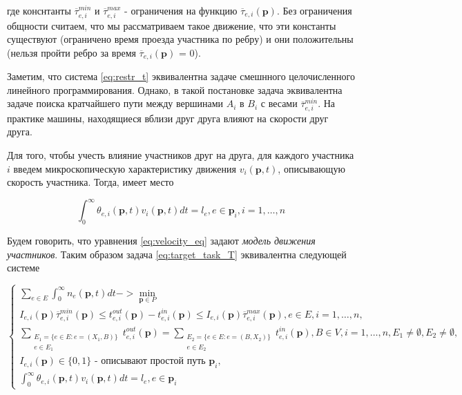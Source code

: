 \documentclass[12pt, a4paper]{article}
\DeclareMathOperator*{\minn}{min}
\begin{document}

где конснтанты $\overline{\tau}_{e, i}^{min}$ и $\overline{\tau}_{e, i}^{max}$ - ограничения на функцию $\overline{\tau}_{e, i} (\textbf{p})$. Без ограничения общности считаем, что мы рассматриваем такое движение, что эти константы существуют (ограничено время проезда участника по ребру) и они положительны (нельзя пройти ребро за время $\overline{\tau}_{e, i} (\textbf{p})$ = 0).

Заметим, что система \eqref{eq:restr_t} эквивалентна задаче смешнного целочисленного линейного программирования. Однако, в такой постановке задача эквивалентна задаче поиска кратчайшего пути между вершинами $A_i$ в $B_i$ с весами $\overline{\tau}_{e, i}^{min}$. На практике машины, находящиеся вблизи друг друга влияют на скорости друг друга.

Для того, чтобы учесть влияние участников друг на друга, для каждого участника $i$ введем микроскопическую характеристику движения $v_i(\textbf{p}, t)$, описывающую скорость участника.
Тогда, имеет место

\begin{equation}
\label{eq:velocity_eq}
\int_{0}^{\infty} \theta_{e, i} (\textbf{p}, t) v_i(\textbf{p}, t) dt = l_e, e \in \textbf{p}_i, i = 1, \dots, n
\end{equation}

Будем говорить, что уравнения \eqref{eq:velocity_eq} задают \textit{модель движения участников}. Таким образом задача \eqref{eq:target_task_T} эквивалентна следующей системе

\begin{equation}
\label{eq:target_task_theta_v}
\begin{cases}
	\sum \limits_{e \in E} \int_{0}^{\infty} n_e (\textbf{p}, t)dt -> \minn\limits_{ \textbf{p} \in P}
	\\
	I_{e, i} (\textbf{p}) \overline{\tau}_{e, i}^{min}(\textbf{p}) \le t_{e, i}^{out}(\textbf{p}) - t_{e, i}^{in}(\textbf{p}) \le I_{e, i}(\textbf{p}) \overline{\tau}_{e, i}^{max}(\textbf{p}), e \in E, i = 1, \dots, n,
	\\
	\sum \limits_{ \substack{E_1 = \{ e \in E: e = (X_1, B) \} \\ e \in E_1}} t_{e, i}^{out} (\textbf{p}) = \sum \limits_{ \substack{E_2 = \{ e \in E: e = (B, X_2) \} \\ e \in E_2}} t_{e, i}^{in} (\textbf{p}), B \in V, i = 1, \dots, n, E_1 \ne \emptyset, E_2 \ne \emptyset,
	\\
	I_{e, i} (\textbf{p}) \in \{0, 1\} \text { - описывают простой путь $\textbf{p}_i$},
	\\
	\int_{0}^{\infty} \theta_{e, i} (\textbf{p}, t) v_i(\textbf{p}, t) dt = l_e, e \in \textbf{p}_i
\end{cases}
\end{equation}
\end{document}

